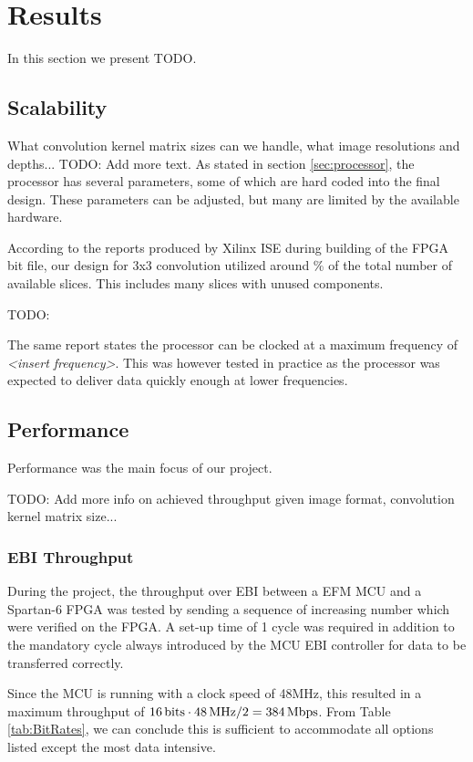 \section{Results}

In this section we present TODO.

\subsection{Scalability}
What convolution kernel matrix sizes can we handle, what image resolutions and depths... TODO: Add more text.
As stated in section \ref{sec:processor}, the processor has several parameters, some of which are hard coded into the final design.
These parameters can be adjusted, but many are limited by the available hardware.

According to the reports produced by Xilinx ISE during building of the FPGA bit file, our design for 3x3 convolution utilized around \unit[16]{\%} of the total number of available slices.
This includes many slices with unused components.

TODO:

The same report states the processor can be clocked at a maximum frequency of \emph{<insert frequency>}. This was however tested in practice as the processor was expected to deliver data quickly enough at lower frequencies.

\subsection{Performance}
Performance was the main focus of our project.

TODO: Add more info on achieved throughput given image format, convolution kernel matrix size...

\subsubsection{EBI Throughput} \label{subsec:EbiThroughput}
During the project, the throughput over EBI between a EFM MCU and a Spartan-6 FPGA was tested by sending a sequence of increasing number which were verified on the FPGA.
A set-up time of 1 cycle was required in addition to the mandatory cycle always introduced by the MCU EBI controller for data to be transferred correctly.

Since the MCU is running with a clock speed of 48MHz, this resulted in a maximum throughput of $\unit[16]{bits} \cdot \unit[48]{MHz} / 2 = \unit[384]{Mbps}$.
From Table \ref{tab:BitRates}, we can conclude this is sufficient to accommodate all options listed except the most data intensive.

